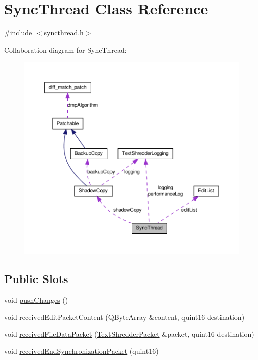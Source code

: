 \hypertarget{class_sync_thread}{
\section{SyncThread Class Reference}
\label{class_sync_thread}
}


{\ttfamily \#include $<$syncthread.h$>$}



Collaboration diagram for SyncThread:\nopagebreak
\begin{figure}[H]
\begin{center}
\leavevmode
\includegraphics[width=400pt]{class_sync_thread__coll__graph}
\end{center}
\end{figure}
\subsection*{Public Slots}
\begin{DoxyCompactItemize}
\item 
void \hyperlink{class_sync_thread_a94389440ca73f3f638c73ed9075dc0e0}{pushChanges} ()
\item 
void \hyperlink{class_sync_thread_a6942467b2594dac2cca3fb6844676548}{receivedEditPacketContent} (QByteArray \&content, quint16 destination)
\item 
void \hyperlink{class_sync_thread_ae054ac8c409f4fd81c473f3fcf5aa44c}{receivedFileDataPacket} (\hyperlink{class_text_shredder_packet}{TextShredderPacket} \&packet, quint16 destination)
\item 
void \hyperlink{class_sync_thread_aa5a7831fb7423397c060c07bffe54fd0}{receivedEndSynchronizationPacket} (quint16)
\end{DoxyCompactItemize}
